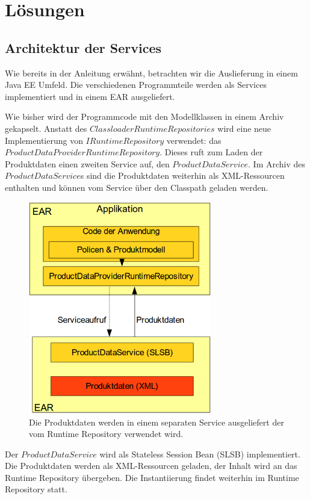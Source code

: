 \documentclass[headsepline=true, footsepline=true]{scrartcl}
\begin{document}
\section{Lösungen}

\subsection{Architektur der Services}

Wie bereits in der Anleitung erwähnt, betrachten wir die Auslieferung in einem
Java EE Umfeld. Die verschiedenen Programmteile werden als Services
implementiert und in einem EAR ausgeliefert.

Wie bisher wird der Programmcode mit den Modellklassen in einem Archiv gekapselt.
Anstatt des $ClassloaderRuntimeRepositories$ wird eine neue Implementierung von
$IRuntimeRepository$ verwendet: das $ProductDataProviderRuntimeRepository$.
Dieses ruft zum Laden der Produktdaten einen zweiten Service auf, den
$ProductDataService$. Im Archiv des $ProductDataService$s sind die Produktdaten
weiterhin als XML-Ressourcen enthalten und können vom Service über den Classpath
geladen werden.

\begin{figure}[htb] \centering
\includegraphics[width=8cm]{./pics/service_architecture.png}
\caption{Die Produktdaten werden in einem separaten Service ausgeliefert der
vom Runtime Repository verwendet wird.}
\label{service_architecture}
\end{figure}

Der $ProductDataService$ wird als Stateless Session Bean (SLSB) implementiert.
Die Produktdaten werden als XML-Ressourcen geladen, der Inhalt wird an das
Runtime Repository übergeben. Die Instantiierung findet weiterhin im Runtime
Repository statt.
\end{document}
